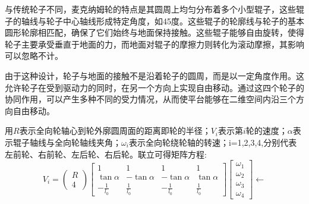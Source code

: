 \documentclass{report}
\begin{document}
与传统轮子不同，麦克纳姆轮的特点是其圆周上均匀分布着多个小型辊子，这些辊子的轴线与轮子中心轴线形成特定角度，如45度。这些辊子的轮廓线与轮子的基本圆形轮廓相匹配，确保了它们始终与地面保持接触。这些辊子能够自由旋转，使得轮子主要承受垂直于地面的力，而地面对辊子的摩擦力则转化为滚动摩擦，其影响可以忽略不计。

由于这种设计，轮子与地面的接触不是沿着轮子的圆周，而是以一定角度作用。这允许轮子在受到驱动力的同时，在另一个方向上实现自由移动。通过这四个轮子的协同作用，可以产生多种不同的受力情况，从而使平台能够在二维空间内沿三个方向自由移动。


用$R$表示全向轮轴心到轮外廓圆周面的距离即轮的半径；$V_i$表示第$i$轮的速度；$\alpha$表示辊子轴线与全向轮轴线夹角；$\omega_i$表示全向轮绕轮轴的转速；i=1,2,3,4,分别代表左前轮、右前轮、左后轮、右后轮。联立可得矩阵方程:
\[ V_i=\begin{pmatrix}R\\4\end{pmatrix}\begin{bmatrix}1&1&1&1\\\tan\alpha&-\tan\alpha&-\tan\alpha&\tan\alpha\\-\frac{1}{l_0}&\frac{1}{l_0}&-\frac{1}{l_0}&\frac{1}{l_0}\end{bmatrix}\begin{bmatrix}\omega_1\\\omega_2\\\omega_3\\\omega_4\end{bmatrix}\leftarrow  \]
\end{document}
